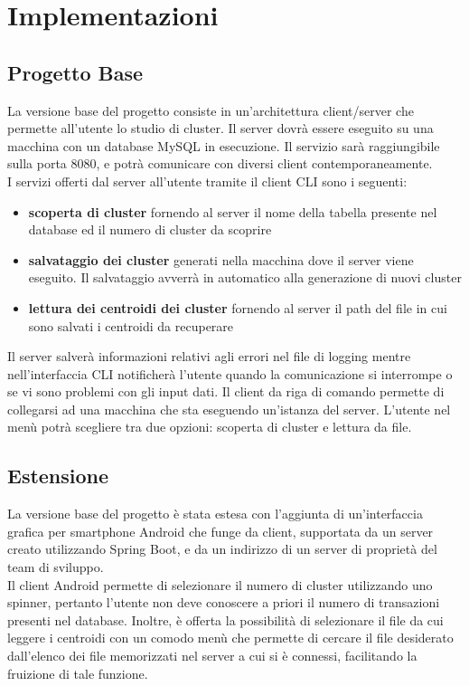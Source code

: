 \section{Implementazioni}
\subsection{Progetto Base}
\noindent La versione base del progetto consiste in un'architettura client/server che permette all'utente lo studio di cluster. Il server dovrà essere eseguito su una macchina con un database MySQL in esecuzione. 
Il servizio sarà raggiungibile sulla porta 8080, e potrà comunicare con diversi client contemporaneamente. 
\\ I servizi offerti dal server all'utente tramite il client CLI sono i seguenti:
\begin{itemize}[label=-]
  \item \textbf{scoperta di cluster} fornendo al server il nome della tabella presente nel database ed il numero di cluster da scoprire
  \item \textbf{salvataggio dei cluster} generati nella macchina dove il server viene eseguito. Il salvataggio avverrà in automatico alla generazione di nuovi cluster
  \item \textbf{lettura dei centroidi dei cluster} fornendo al server il path del file in cui sono salvati i centroidi da recuperare 
\end{itemize}
Il server salverà informazioni relativi agli errori nel file di logging mentre nell'interfaccia CLI notificherà l'utente quando la comunicazione si interrompe o se vi sono problemi con gli input dati. Il client da riga di comando permette di collegarsi ad una macchina che sta eseguendo un'istanza del server. L'utente nel menù potrà scegliere tra due opzioni: scoperta di cluster e lettura da file.

\subsection{Estensione}
\noindent La versione base del progetto è stata estesa con l'aggiunta di un'interfaccia grafica per smartphone Android che funge da client, supportata da un server creato utilizzando Spring Boot, e da un indirizzo di un server di proprietà del team di sviluppo. \\ Il client Android permette di selezionare il numero di cluster utilizzando uno spinner, pertanto l'utente non deve conoscere a priori il numero di transazioni presenti nel database. Inoltre, è offerta la possibilità di selezionare il file da cui leggere i centroidi con un comodo menù che permette di cercare il file desiderato dall'elenco dei file memorizzati nel server a cui si è connessi, facilitando la fruizione di tale funzione.  